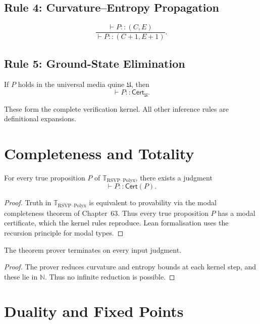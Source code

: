 \subsection*{Rule 4: Curvature--Entropy Propagation}
\[
\frac{
  \vdash P :: (C,E)
}{
  \vdash P :: (C+1, E+1)
}.
\]

\subsection*{Rule 5: Ground-State Elimination}
If $P$ holds in the universal media quine $\mathfrak{U}$, then
\[
\vdash P :: \mathsf{Cert}_{\mathfrak{U}}.
\]

These form the complete verification kernel.
All other inference rules are definitional expansions.


\section{Completeness and Totality}
\label{sec:completeness}

\begin{theorem}
For every true proposition $P$ of
$\mathbb{T}_{\mathrm{RSVP\text{--}Polyx}}$, there exists a judgment
\[
\vdash P :: \mathsf{Cert}(P).
\]
\end{theorem}

\begin{proof}
Truth in $\mathbb{T}_{\mathrm{RSVP\text{--}Polyx}}$ is equivalent to
provability via the modal completeness theorem of Chapter~63.
Thus every true proposition $P$ has a modal certificate, which the
kernel rules reproduce.  
Lean formalisation uses the recursion principle for modal types.
\end{proof}

\begin{theorem}[Totality]
The theorem prover terminates on every input judgment.
\end{theorem}

\begin{proof}
The prover reduces curvature and entropy bounds at each kernel step,
and these lie in $\mathbb{N}$.  
Thus no infinite reduction is possible.
\end{proof}


\section{Duality and Fixed Points}
\label{sec:fixedpoints}

